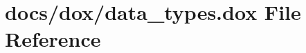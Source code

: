 \hypertarget{data__types_8dox}{\section{docs/dox/data\+\_\+types.dox File Reference}
\label{data__types_8dox}
}
